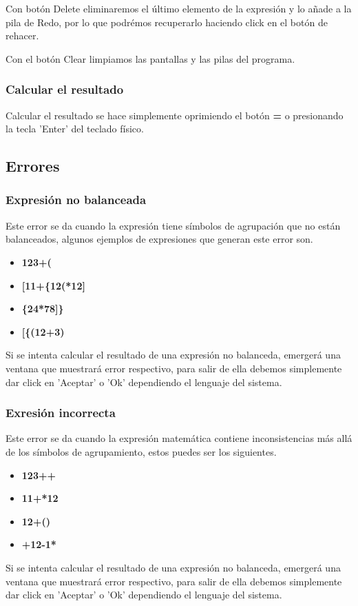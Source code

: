 \documentclass[a4paper,12pt]{article}
\begin{document}
Con botón Delete eliminaremos el último elemento de la expresión y lo añade a la pila de Redo, por lo que podrémos recuperarlo haciendo click en el botón de rehacer. 

Con el botón Clear limpiamos las pantallas y las pilas del programa.

\subsubsection{Calcular el resultado}
Calcular el resultado se hace simplemente oprimiendo el botón \textbf{=} o presionando la tecla 'Enter' del teclado físico.


\subsection{Errores}
\subsubsection{Expresión no balanceada}
Este error se da cuando la expresión tiene símbolos de agrupación que no están balanceados, algunos ejemplos de expresiones que generan este error son.
\begin{itemize}
    \item \textbf{123+(} 
    \item \textbf{ [11+\{12(*12] }
    \item \textbf{\{24*78]\}}
    \item \textbf{ [\{(12+3) }
\end{itemize}
Si se intenta calcular el resultado de una expresión no balanceda, emergerá una ventana que muestrará error respectivo, para salir de ella debemos simplemente dar click en 'Aceptar' o 'Ok' dependiendo el lenguaje del sistema.

\subsubsection{Exresión incorrecta}
Este error se da cuando la expresión matemática contiene inconsistencias más allá de los símbolos de agrupamiento, estos puedes ser los siguientes.
\begin{itemize}
    \item \textbf{123++} 
    \item \textbf{ 11+*12 }
    \item \textbf{12+()}
    \item \textbf{ +12-1* }
\end{itemize}
Si se intenta calcular el resultado de una expresión no balanceda, emergerá una ventana que muestrará error respectivo, para salir de ella debemos simplemente dar click en 'Aceptar' o 'Ok' dependiendo el lenguaje del sistema.
\end{document}
